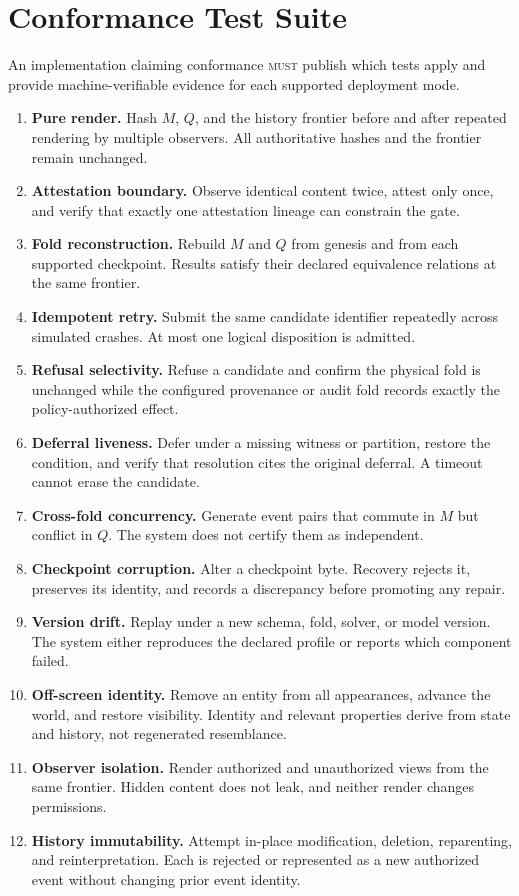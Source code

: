 \documentclass[11pt]{article}
\newcommand{\MUST}{\textsc{must}}
\begin{document}
\section{Conformance Test Suite}

An implementation claiming conformance \MUST{} publish which tests apply and provide machine-verifiable evidence for each supported deployment mode.

\begin{enumerate}[label=\textbf{T\arabic*.},leftmargin=*]
\item \textbf{Pure render.} Hash $M$, $Q$, and the history frontier before and after repeated rendering by multiple observers. All authoritative hashes and the frontier remain unchanged.
\item \textbf{Attestation boundary.} Observe identical content twice, attest only once, and verify that exactly one attestation lineage can constrain the gate.
\item \textbf{Fold reconstruction.} Rebuild $M$ and $Q$ from genesis and from each supported checkpoint. Results satisfy their declared equivalence relations at the same frontier.
\item \textbf{Idempotent retry.} Submit the same candidate identifier repeatedly across simulated crashes. At most one logical disposition is admitted.
\item \textbf{Refusal selectivity.} Refuse a candidate and confirm the physical fold is unchanged while the configured provenance or audit fold records exactly the policy-authorized effect.
\item \textbf{Deferral liveness.} Defer under a missing witness or partition, restore the condition, and verify that resolution cites the original deferral. A timeout cannot erase the candidate.
\item \textbf{Cross-fold concurrency.} Generate event pairs that commute in $M$ but conflict in $Q$. The system does not certify them as independent.
\item \textbf{Checkpoint corruption.} Alter a checkpoint byte. Recovery rejects it, preserves its identity, and records a discrepancy before promoting any repair.
\item \textbf{Version drift.} Replay under a new schema, fold, solver, or model version. The system either reproduces the declared profile or reports which component failed.
\item \textbf{Off-screen identity.} Remove an entity from all appearances, advance the world, and restore visibility. Identity and relevant properties derive from state and history, not regenerated resemblance.
\item \textbf{Observer isolation.} Render authorized and unauthorized views from the same frontier. Hidden content does not leak, and neither render changes permissions.
\item \textbf{History immutability.} Attempt in-place modification, deletion, reparenting, and reinterpretation. Each is rejected or represented as a new authorized event without changing prior event identity.
\end{enumerate}
\end{document}
